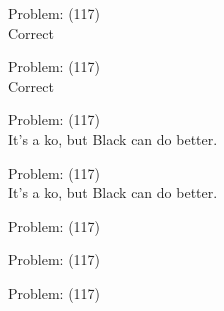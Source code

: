 \documentclass[11pt]{article}
\begin{document}
\begin{minipage}[t]{0.5\textwidth}
  {\centering
  
  Problem: (117)\\
  Correct\\
  }
\end{minipage}
\begin{minipage}[t]{0.5\textwidth}
  {\centering
  
  Problem: (117)\\
  Correct\\
  }
\end{minipage}
\begin{minipage}[t]{0.5\textwidth}
  {\centering
  
  Problem: (117)\\
  It's a ko, but Black can do better.\\
  }
\end{minipage}
\begin{minipage}[t]{0.5\textwidth}
  {\centering
  
  Problem: (117)\\
  It's a ko, but Black can do better.\\
  }
\end{minipage}
\begin{minipage}[t]{0.5\textwidth}
  {\centering
  
  Problem: (117)\\
  
  }
\end{minipage}
\begin{minipage}[t]{0.5\textwidth}
  {\centering
  
  Problem: (117)\\
  
  }
\end{minipage}
\begin{minipage}[t]{0.5\textwidth}
  {\centering
  
  Problem: (117)\\
  
  }
\end{minipage}
\end{document}
